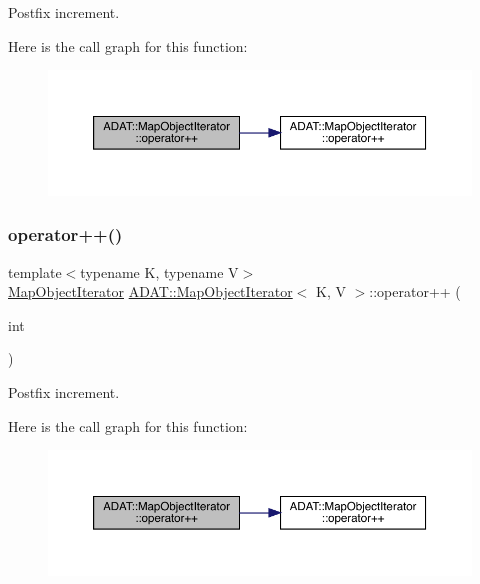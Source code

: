 Postfix increment. 

Here is the call graph for this function\+:
\nopagebreak
\begin{figure}[H]
\begin{center}
\leavevmode
\includegraphics[width=350pt]{d2/d4b/classADAT_1_1MapObjectIterator_a90809a5488988dd0d49ce25df35756ae_cgraph}
\end{center}
\end{figure}
\mbox{\label{classADAT_1_1MapObjectIterator_a90809a5488988dd0d49ce25df35756ae}} 
\subsubsection{\texorpdfstring{operator++()}{operator++()}\hspace{0.1cm}{\footnotesize\ttfamily [5/6]}}
{\footnotesize\ttfamily template$<$typename K, typename V$>$ \\
\mbox{\hyperlink{classADAT_1_1MapObjectIterator}{Map\+Object\+Iterator}} \mbox{\hyperlink{classADAT_1_1MapObjectIterator}{A\+D\+A\+T\+::\+Map\+Object\+Iterator}}$<$ K, V $>$\+::operator++ (\begin{DoxyParamCaption}\item[{int}]{ }\end{DoxyParamCaption})\hspace{0.3cm}{\ttfamily [inline]}}



Postfix increment. 

Here is the call graph for this function\+:
\nopagebreak
\begin{figure}[H]
\begin{center}
\leavevmode
\includegraphics[width=350pt]{d2/d4b/classADAT_1_1MapObjectIterator_a90809a5488988dd0d49ce25df35756ae_cgraph}
\end{center}
\end{figure}
\mbox{\label{classADAT_1_1MapObjectIterator_a90809a5488988dd0d49ce25df35756ae}} 
